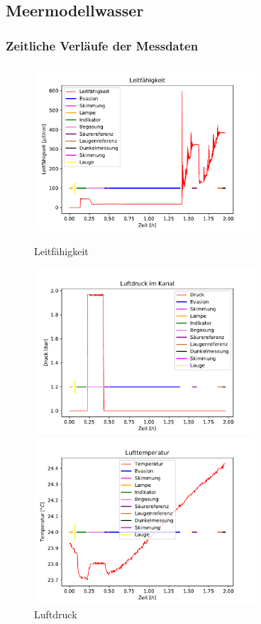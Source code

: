 \documentclass[12pt]{article}
\begin{document}
\subsection{Meermodellwasser}
\subsubsection{Zeitliche Verl\"aufe der Messdaten}

\begin{figure}[H]
	\centering
	\parbox{82.5mm}{
		\centering
		\includegraphics[width=82.5mm]{Meerwasser/Leitfaehigkeit}
		\caption{Leitf\"ahigkeit}
	}
	\hfill%
	\parbox{82.5mm}{
		\centering
		\includegraphics[width=82.5mm]{Meerwasser/Luftdruck}
		\caption{Luftdruck}
	}
	\centering
	\parbox{82.5mm}{
		\centering
		\includegraphics[width=82.5mm]{Meerwasser/Lufttemperatur}
}
\end{figure}
\end{document}
